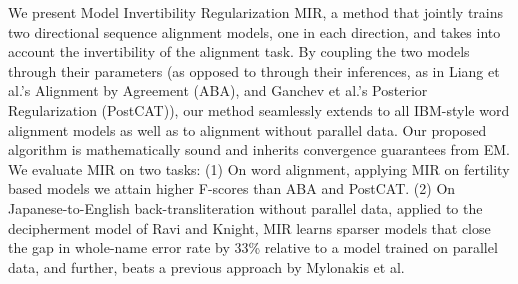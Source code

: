 We present Model Invertibility Regularization MIR, a method that jointly trains two directional sequence alignment models, one in each direction, and takes into account the invertibility of the alignment task. By coupling the two models through their parameters (as opposed to through their inferences, as in Liang et al.'s Alignment by Agreement (ABA), and Ganchev et al.'s Posterior Regularization (PostCAT)), our method seamlessly extends to all IBM-style word alignment models as well as to alignment without parallel data. Our proposed algorithm is mathematically sound and inherits convergence guarantees from EM. We evaluate MIR on two tasks: (1) On word alignment, applying MIR on fertility based models we attain higher F-scores than ABA and PostCAT. (2) On Japanese-to-English back-transliteration without parallel data, applied to the decipherment model of Ravi and Knight, MIR learns sparser models that close the gap in whole-name error rate by 33\% relative to a model trained on parallel data, and further, beats a previous approach by Mylonakis et al.
